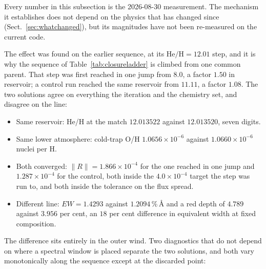 \documentclass[english,a4paper]{my_memo}
\begin{document}
Every number in this subsection is the 2026-08-30 measurement. The mechanism
it establishes does not depend on the physics that has changed since
(Sect.~\ref{sec:whatchanged}), but its magnitudes have not been re-measured
on the current code.

The effect was found on the earlier sequence, at its $\mathrm{He/H} = 12.01$
step, and it is why the sequence of Table~\ref{tab:closureladder} is climbed
from one common parent. That step was first reached in one jump from $8.0$, a
factor $1.50$ in reservoir; a control run reached the same reservoir from
$11.11$, a factor $1.08$. The two solutions agree on everything the iteration
and the chemistry set, and disagree on the line:

\begin{itemize}
\item Same reservoir: He/H at the match $12.013522$ against
      $12.013520$, seven digits.
\item Same lower atmosphere: cold-trap O/H $1.0656\times10^{-6}$
      against $1.0660\times10^{-6}$ nuclei per H.
\item Both converged: $\|R\| = 1.866\times10^{-4}$ for the one reached in
      one jump and $1.287\times10^{-4}$ for the control, both inside the
      $4.0\times10^{-4}$ target the step was run to, and both inside the
      tolerance on the flux spread.
\item Different line: $EW = 1.4293$ against $1.2094$\,\%\,\AA{} and a
      red depth of $4.789$ against $3.956$ per cent, an $18$ per cent
      difference in equivalent width at fixed composition.
\end{itemize}

\noindent The difference sits entirely in the outer wind. Two diagnostics
that do not depend on where a spectral window is placed separate the two
solutions, and both vary monotonically along the sequence except at the
discarded point:
\end{document}
